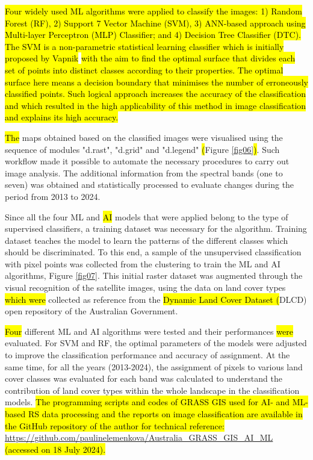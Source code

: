 \documentclass[jmse,article,submit,pdftex,moreauthors]{Definitions/mdpi}
\begin{document}
\hl{Four widely used ML algorithms were applied to classify the images: 1) Random Forest (RF), 2) Support 7 Vector Machine (SVM), 3) ANN-based approach using Multi-layer Perceptron (MLP) Classifier; and 4) Decision Tree Classifier (DTC). The SVM is a non-parametric statistical learning classifier which is initially proposed by Vapnik} \cite{788640} \hl{with the aim to find the optimal surface that divides each set of points into distinct classes according to their properties. The optimal surface here means a decision boundary that minimises the number of erroneously classified points. Such logical approach increases the accuracy of the classification and which resulted in the high applicability of this method in image classification and explains its high accuracy.}

\hl{The} maps obtained based on the classified images were visualised using the sequence of modules "d.rast", "d.grid" and "d.legend" \hl{(}Figure \ref{fig06}\hl{)}.  Such workflow made it possible to automate the necessary procedures to carry out image analysis. The additional information from the spectral bands (one to seven)  was obtained and statistically processed to evaluate changes during the period from 2013 to 2024. 

Since all the four ML and \hl{AI} models that were applied belong to the type of supervised classifiers, a training dataset was necessary for the algorithm. Training dataset teaches the model to learn the patterns of the different classes which should be discriminated. To this end, a sample of the unsupervised classification with pixel points was collected from the clustering to train the ML and AI algorithms, Figure \ref{fig07}. This initial raster dataset was augmented through the visual recognition of the satellite images, using the data on land cover types \hl{which were }collected as reference from the \hl{Dynamic Land Cover Dataset (}DLCD) open repository of the Australian Government. 

\hl{Four} different ML and AI algorithms were tested and their performances \hl{were} evaluated. For SVM and RF, the optimal parameters of the models were adjusted to improve the classification performance and accuracy of assignment. At the same time, for all the years (2013-2024), the assignment of pixels to various land cover classes was evaluated for each band was calculated to understand the contribution of land cover types within the whole landscape in the classification models. \hl{The programming scripts and codes of GRASS GIS used for AI- and ML-based RS data processing and the reports on image classification are available in the GitHub repository of the author for technical reference:} \href{https://github.com/paulinelemenkova/Australia_GRASS_GIS_AI_ML}{https://github.com/paulinelemenkova/Australia\_GRASS\_GIS\_AI\_ML} \hl{(accessed on 18 July 2024).}
\end{document}
